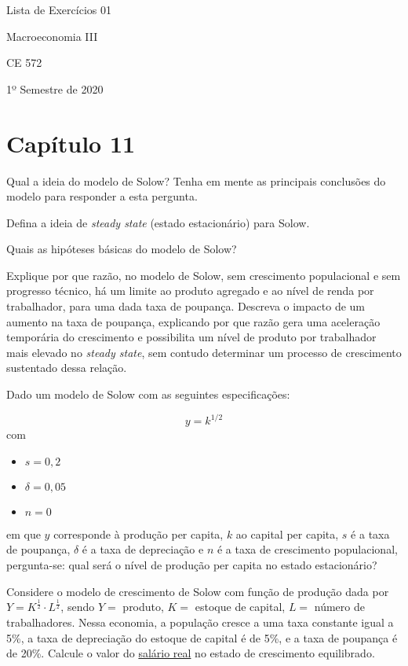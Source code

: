 \documentclass[12pt,a4paper]{article}
\begin{document}
	\begin{center}
    {\huge Lista de Exercícios 01 \par}
    {\LARGE Macroeconomia III \par}
    {CE 572 \par}
    {1º Semestre de 2020}
	\end{center}

\section*{Capítulo 11}

\problem Qual a ideia do modelo de Solow? Tenha em mente as principais conclusões do modelo para responder a esta pergunta.

\problem Defina a ideia de \textit{steady state} (estado estacionário) para Solow.

\problem Quais as hipóteses básicas do modelo de Solow?

\problem Explique por que razão, no modelo de Solow, sem crescimento populacional e
sem progresso técnico, há um limite ao produto agregado e ao nível de renda por
trabalhador, para uma dada taxa de poupança. Descreva o impacto de um aumento na
taxa de poupança, explicando por que razão gera uma aceleração temporária do
crescimento e possibilita um nível de produto por trabalhador mais elevado no \textit{steady
state}, sem contudo determinar um processo de crescimento sustentado dessa relação.

\problem Dado um modelo de Solow com as seguintes especificações:


$$y = k^{1/2}$$
com
\begin{itemize}
	\item $s = 0,2$
	\item $\delta = 0,05$ 
	\item $n=0$
\end{itemize}
em que $y$ corresponde à produção per capita, $k$ ao capital per capita, $s$ é a taxa de poupança, $\delta$ é a taxa de depreciação e $n$ é a taxa de crescimento populacional, pergunta-se: qual será o nível de produção per capita no estado estacionário?


\problem Considere o modelo de crescimento de Solow com função de produção dada por ${Y = K^{\frac{1}{2}}\cdot L^{\frac{1}{2}}}$, sendo $Y =$ produto, $K =$ estoque de capital, $L =$ número de trabalhadores. Nessa economia, a população cresce a uma taxa constante igual a 5\%, a taxa de depreciação do estoque de capital é de 5\%, e a taxa de poupança é de 20\%. Calcule o valor do \underline{salário real} no estado de crescimento equilibrado.
\end{document}
